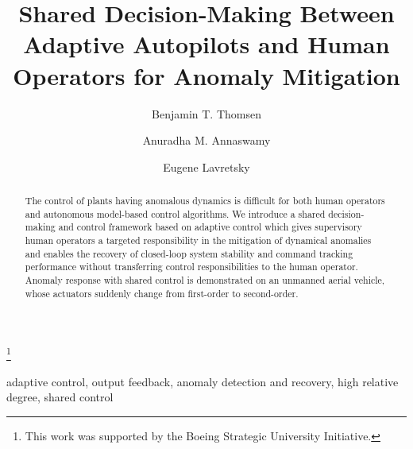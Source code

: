 \documentclass[english]{ifacconf}
\begin{document}
\begin{frontmatter}
	
\title{Shared Decision-Making Between Adaptive Autopilots and Human Operators for Anomaly Mitigation}

\thanks[footnoteinfo]{This work was supported by the Boeing Strategic University Initiative.}

\author[MIT]{Benjamin T. Thomsen} 
\author[MIT]{Anuradha M. Annaswamy} 
\author[Boeing]{Eugene Lavretsky} 

\address[MIT]{Massachusetts Institute of Technology, 
   Cambridge, MA 02139}%
\address[Boeing]{The Boeing Company, 
   Huntington Beach, CA 92647}

\begin{abstract}
The control of plants having anomalous dynamics is difficult for both human operators and autonomous model-based control algorithms. We introduce a shared decision-making and control framework based on adaptive control which gives supervisory human operators a targeted responsibility in the mitigation of dynamical anomalies and enables the recovery of closed-loop system stability and command tracking performance without transferring control responsibilities to the human operator. Anomaly response with shared control is demonstrated on an unmanned aerial vehicle, whose actuators suddenly change from first-order to second-order.
\end{abstract}
\begin{keyword}
adaptive control, output feedback, anomaly detection and recovery, high relative degree, shared control
\end{keyword}

\end{frontmatter}
\end{document}
